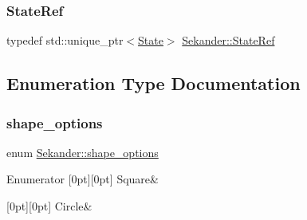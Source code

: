 \mbox{\label{namespaceSekander_a8503cedf9c863e9f6986eb29f2296f1a}} 
\subsubsection{\texorpdfstring{State\+Ref}{StateRef}}
{\footnotesize\ttfamily typedef std\+::unique\+\_\+ptr$<$\hyperlink{classSekander_1_1State}{State}$>$ \hyperlink{namespaceSekander_a8503cedf9c863e9f6986eb29f2296f1a}{Sekander\+::\+State\+Ref}}



\subsection{Enumeration Type Documentation}
\mbox{\label{namespaceSekander_aed8eb219f4685b29738464e9f32c5d94}} 
\subsubsection{\texorpdfstring{shape\+\_\+options}{shape\_options}}
{\footnotesize\ttfamily enum \hyperlink{namespaceSekander_aed8eb219f4685b29738464e9f32c5d94}{Sekander\+::shape\+\_\+options}}

\begin{DoxyEnumFields}{Enumerator}
[0pt][0pt]{}\mbox{\label{namespaceSekander_aed8eb219f4685b29738464e9f32c5d94ae1827bea553b36ce0bbc7cddd6c57621}} 
Square&\\
\hline

[0pt][0pt]{}\mbox{\label{namespaceSekander_aed8eb219f4685b29738464e9f32c5d94acafcba9574f3415e8e9f6f194a6cb869}} 
Circle&\\
\hline

\end{DoxyEnumFields}


